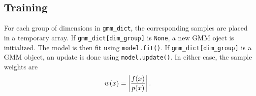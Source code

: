 \documentclass{article}
\begin{document}
\subsection{Training}

For each group of dimensions in \texttt{gmm\_dict}, the corresponding samples
are placed in a temporary array. If \texttt{gmm\_dict[dim\_group]} is
\texttt{None}, a new GMM oject is initialized. The model is then fit using
\texttt{model.fit()}. If \texttt{gmm\_dict[dim\_group]} is a GMM object,
an update is done using \texttt{model.update()}. In either case, the sample
weights are
\begin{equation}
    w(x) = \left| {f(x) \over p(x)} \right|.
\end{equation}
\end{document}
